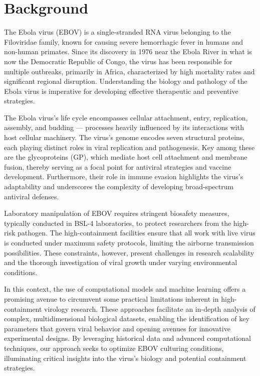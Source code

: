 \documentclass{article}
\begin{document}
\section{Background}
The Ebola virus (EBOV) is a single-stranded RNA virus belonging to the Filoviridae family, known for causing severe hemorrhagic fever in humans and non-human primates. Since its discovery in 1976 near the Ebola River in what is now the Democratic Republic of Congo, the virus has been responsible for multiple outbreaks, primarily in Africa, characterized by high mortality rates and significant regional disruption. Understanding the biology and pathology of the Ebola virus is imperative for developing effective therapeutic and preventive strategies.

The Ebola virus's life cycle encompasses cellular attachment, entry, replication, assembly, and budding — processes heavily influenced by its interactions with host cellular machinery. The virus's genome encodes seven structural proteins, each playing distinct roles in viral replication and pathogenesis. Key among these are the glycoproteins (GP), which mediate host cell attachment and membrane fusion, thereby serving as a focal point for antiviral strategies and vaccine development. Furthermore, their role in immune evasion highlights the virus's adaptability and underscores the complexity of developing broad-spectrum antiviral defenses.

Laboratory manipulation of EBOV requires stringent biosafety measures, typically conducted in BSL-4 laboratories, to protect researchers from the high-risk pathogen. The high-containment facilities ensure that all work with live virus is conducted under maximum safety protocols, limiting the airborne transmission possibilities. These constraints, however, present challenges in research scalability and the thorough investigation of viral growth under varying environmental conditions.

In this context, the use of computational models and machine learning offers a promising avenue to circumvent some practical limitations inherent in high-containment virology research. These approaches facilitate an in-depth analysis of complex, multidimensional biological datasets, enabling the identification of key parameters that govern viral behavior and opening avenues for innovative experimental designs. By leveraging historical data and advanced computational techniques, our approach seeks to optimize EBOV culturing conditions, illuminating critical insights into the virus's biology and potential containment strategies.
\end{document}
